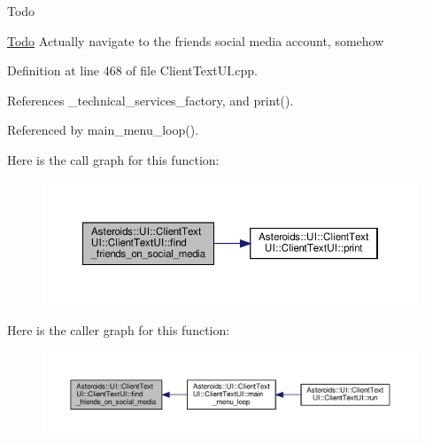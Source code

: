 \begin{DoxyRefDesc}{Todo}
\item[\hyperlink{todo__todo000023}{Todo}]Actually navigate to the friend\textquotesingle{}s social media account, somehow \end{DoxyRefDesc}


Definition at line 468 of file Client\+Text\+U\+I.\+cpp.



References \+\_\+technical\+\_\+services\+\_\+factory, and print().



Referenced by main\+\_\+menu\+\_\+loop().

Here is the call graph for this function\+:
\nopagebreak
\begin{figure}[H]
\begin{center}
\leavevmode
\includegraphics[width=350pt]{classAsteroids_1_1UI_1_1ClientTextUI_1_1ClientTextUI_ac6ed983203b9d88a3a7d532eeceac524_cgraph}
\end{center}
\end{figure}
Here is the caller graph for this function\+:
\nopagebreak
\begin{figure}[H]
\begin{center}
\leavevmode
\includegraphics[width=350pt]{classAsteroids_1_1UI_1_1ClientTextUI_1_1ClientTextUI_ac6ed983203b9d88a3a7d532eeceac524_icgraph}
\end{center}
\end{figure}
\mbox{\label{classAsteroids_1_1UI_1_1ClientTextUI_1_1ClientTextUI_aaea5f1fccb9aa46a331b15ad2274b319}} 
